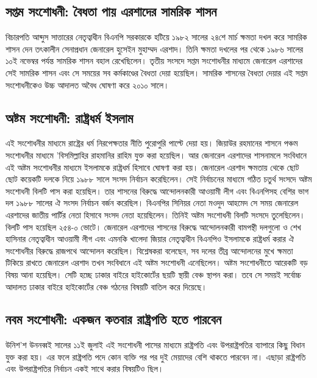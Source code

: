 \documentclass[11pt]{article}
\begin{document}
\subsection{সপ্তম সংশোধনী: বৈধতা পায় এরশাদের সামরিক শাসন}
\label{sec:orgfcd1317}
বিচারপতি আব্দুস সাত্তারের নেতৃত্বাধীন বিএনপি সরকারকে হটিয়ে ১৯৮২
সালের ২৪শে মার্চ ক্ষমতা দখল করে সামরিক শাসন দেন তৎকালীন
সেনাপ্রধান জেনারেল হুসেইন মুহাম্মদ এরশাদ। তিনি ক্ষমতা দখলের পর
থেকে ১৯৮৬ সালের ১০ই নভেম্বর পর্যন্ত সামরিক শাসন বহাল রেখেছিলেন।
তৃতীয় সংসদে সপ্তম সংশোধনীর মাধ্যমে জেনারেল এরশাদের সেই সামরিক
শাসন এবং সে সময়ের সব কর্মকাণ্ডের বৈধতা দেয়া হয়েছিল। সামরিক
শাসনের বৈধতা দেয়ার এই সপ্তম সংশোধনীকেও উচ্চ আদালত অবৈধ ঘোষণা
করে ২০১০ সালে।

\subsection{অষ্টম সংশোধনী: রাষ্ট্রধর্ম ইসলাম}
\label{sec:orgc052ac6}
এই সংশোধনীর মাধ্যমে রাষ্ট্রের ধর্ম নিরপেক্ষতার নীতি পুরোপুরি পাল্টে
দেয়া হয়। জিয়াউর রহমানের শাসনে পঞ্চম সংশোধনীর মাধ্যমে
'বিসমিল্লাহির রাহমানির রাহিম যুক্ত করা হয়েছিল। আর জেনারেল
এরশাদের শাসনামলে সংবিধানে এই অষ্টম সংশোধনীর মাধ্যমে ইসলামকে
রাষ্ট্রধর্ম হিসাবে ঘোষণা করা হয়। জেনারেল এরশাদ ক্ষমতায় থেকে ছোট
ছোট কয়েকটি দলকে নিয়ে ১৯৮৮ সালে সংসদ নির্বাচন করেছিলেন। সেই
নির্বাচনের মাধ্যমে গঠিত চতুর্থ সংসদে অষ্টম সংশোধনী বিলটি পাস করা
হয়েছিল। তার শাসনের বিরুদ্ধে আন্দোলনকারী আওয়ামী লীগ এবং বিএনপিসহ
বেশির ভাগ দল ১৯৮৮ সালের ঐ সংসদ নির্বাচন বর্জন করেছিল। বিএনপির
সিনিয়র নেতা মওদুদ আহমেদ সে সময় জেনারেল এরশাদের জাতীয় পার্টির
নেতা হিসাবে সংসদ নেতা হয়েছিলেন। তিনিই অষ্টম সংশোধনী বিলটি
সংসদে তুলেছিলেন। বিলটি পাস হয়েছিল ২৫৪-০ ভোটে। জেনারেল এরশাদের
শাসনের বিরুদ্ধে আন্দোলনকারী বামপন্থী দলগুলো ও শেখ হাসিনার
নেতৃত্বাধীন আওয়ামী লীগ এবং এমনকি খালেদা জিয়ার নেতৃত্বাধীন
বিএনপিও ইসলামকে রাষ্ট্রধর্ম করার ঐ সংশোধনীর বিরুদ্ধে রাজপথে
আন্দোলন করেছিল। বিশ্লেষকরা বলেছেন, সব দলের তীব্র আন্দোলনের মুখে
ক্ষমতা টিকিয়ে রাখতে জেনারেল এরশাদ তখন সংবিধানে এই অষ্টম
সংশোধনী এনেছিলেন। অষ্টম সংশোধনীতে আরেকটি বড় বিষয় আনা হয়েছিল।
সেটি হচ্ছে ঢাকার বাইরে হাইকোর্টের ছয়টি স্থায়ী বেঞ্চ স্থাপন করা।
তবে সে সময়ই সর্বোচ্চ আদালত ঢাকার বাইরে হাইকোর্টের বেঞ্চ গঠনের
বিষয়টি বাতিল করে দিয়েছে।

\subsection{নবম সংশোধনী: একজন কতবার রাষ্ট্রপতি হতে পারবেন}
\label{sec:orgf9cecb9}
উনিশ'শ উননব্বই সালের ১১ই জুলাই এই সংশোধনী পাসের মাধ্যমে
রাষ্ট্রপতি এবং উপরাষ্ট্রপতির ব্যাপারে কিছু বিধান যুক্ত করা হয়। এর
ফলে রাষ্ট্রপতি পদে কোন ব্যক্তি পর পর দুই মেয়াদের বেশি থাকতে
পারবেন না। এছাড়া রাষ্ট্রপতি এবং উপরাষ্ট্রপতির নির্বাচন একই সাথে
করার বিষয়টিও ছিল।
\end{document}

